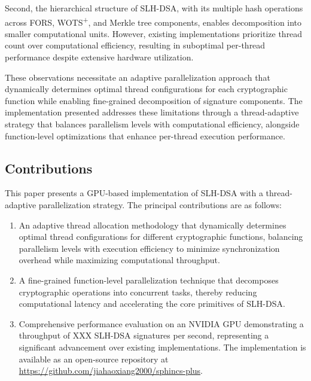 \documentclass[journal]{IEEEtran}
\begin{document}
Second, the hierarchical structure of SLH-DSA, with its multiple hash operations across FORS, WOTS\textsuperscript{+}, and Merkle tree components, enables decomposition into smaller computational units. However, existing implementations prioritize thread count over computational efficiency, resulting in suboptimal per-thread performance despite extensive hardware utilization.

These observations necessitate an adaptive parallelization approach that dynamically determines optimal thread configurations for each cryptographic function while enabling fine-grained decomposition of signature components. The implementation presented addresses these limitations through a thread-adaptive strategy that balances parallelism levels with computational efficiency, alongside function-level optimizations that enhance per-thread execution performance.

\subsection{Contributions}


This paper presents a GPU-based implementation of SLH-DSA with a thread-adaptive parallelization strategy. The principal contributions are as follows:

\begin{enumerate}
  \item An adaptive thread allocation methodology that dynamically determines optimal thread configurations for different cryptographic functions, balancing parallelism levels with execution efficiency to minimize synchronization overhead while maximizing computational throughput.

  \item A fine-grained function-level parallelization technique that decomposes cryptographic operations into concurrent tasks, thereby reducing computational latency and accelerating the core primitives of SLH-DSA.

  \item Comprehensive performance evaluation on an NVIDIA GPU demonstrating a throughput of XXX SLH-DSA signatures per second, representing a significant advancement over existing implementations. The implementation is available as an open-source repository at \url{https://github.com/jiahaoxiang2000/sphincs-plus}.
\end{enumerate}
\end{document}
